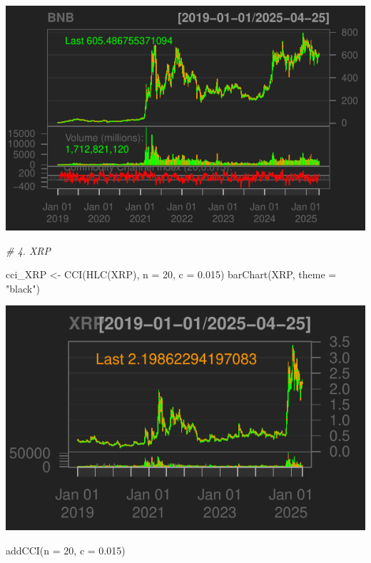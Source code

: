 \documentclass[]{tufte-handout}
\newenvironment{Shaded}{}{}
\newcommand{\AttributeTok}[1]{\textcolor[rgb]{0.49,0.56,0.16}{#1}}
\newcommand{\CommentTok}[1]{\textcolor[rgb]{0.38,0.63,0.69}{\textit{#1}}}
\newcommand{\DecValTok}[1]{\textcolor[rgb]{0.25,0.63,0.44}{#1}}
\newcommand{\FloatTok}[1]{\textcolor[rgb]{0.25,0.63,0.44}{#1}}
\newcommand{\FunctionTok}[1]{\textcolor[rgb]{0.02,0.16,0.49}{#1}}
\newcommand{\NormalTok}[1]{#1}
\newcommand{\OtherTok}[1]{\textcolor[rgb]{0.00,0.44,0.13}{#1}}
\newcommand{\StringTok}[1]{\textcolor[rgb]{0.25,0.44,0.63}{#1}}
\begin{document}
\includegraphics{cripto_update_files/figure-latex/unnamed-chunk-11-6}

\begin{Shaded}
\begin{Highlighting}[]
\CommentTok{\# 4. XRP}

\NormalTok{cci\_XRP }\OtherTok{\textless{}{-}} \FunctionTok{CCI}\NormalTok{(}\FunctionTok{HLC}\NormalTok{(XRP), }\AttributeTok{n =} \DecValTok{20}\NormalTok{, }\AttributeTok{c =} \FloatTok{0.015}\NormalTok{)}
\FunctionTok{barChart}\NormalTok{(XRP, }\AttributeTok{theme =} \StringTok{"black"}\NormalTok{)}
\end{Highlighting}
\end{Shaded}

\includegraphics{cripto_update_files/figure-latex/unnamed-chunk-11-7}

\begin{Shaded}
\begin{Highlighting}[]
\FunctionTok{addCCI}\NormalTok{(}\AttributeTok{n =} \DecValTok{20}\NormalTok{, }\AttributeTok{c =} \FloatTok{0.015}\NormalTok{)}
\end{Highlighting}
\end{Shaded}
\end{document}
